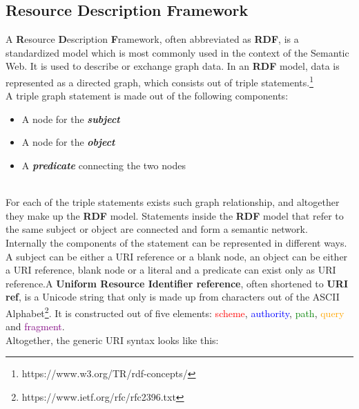 \documentclass[12pt, oneside]{article}
\begin{document}
\subsection{Resource Description Framework} \label{rdf}
A \textbf{R}esource \textbf{D}escription \textbf{F}ramework, often abbreviated as \textbf{RDF}, is a standardized model which is most commonly used in the context of the Semantic Web. It is used to describe or exchange graph data. In an \textbf{RDF} model, data is represented as a directed graph, which consists out of triple statements.\footnote[4]{https://www.w3.org/TR/rdf-concepts/}
\\
A triple graph statement is made out of the following components:
\vspace{0.3cm}\\
\begin{minipage}{.5\textwidth}
    \begin{itemize}
        \item A node for the \textit{\textbf{subject}}
        \item A node for the \textit{\textbf{object}}
        \item A \textit{\textbf{predicate}} connecting the two nodes
    \end{itemize} 
\end{minipage}
\begin{minipage}{.5\textwidth}
\end{minipage}
\vspace{0.3cm}\\
For each of the triple statements exists such graph relationship, and altogether they make up the \textbf{RDF} model. Statements inside the \textbf{RDF} model that refer to the same subject or object are connected and form a semantic network.
\vspace{0.3cm}\\
Internally the components of the statement can be represented in different ways. A subject can be either a URI reference or a blank node, an object can be either a URI reference, blank node or a literal and a predicate can exist only as URI reference.\footnotemark[4] A \textbf{Uniform Resource Identifier reference}, often shortened to \textbf{URI ref}, is a Unicode string that only is made up from characters out of the ASCII Alphabet\footnote[5]{https://www.ietf.org/rfc/rfc2396.txt}. It is constructed out of five elements: \textcolor{red}{scheme}, \textcolor{blue}{authority}, \textcolor{green}{path}, \textcolor{orange}{query} and \textcolor{purple}{fragment}.\\ Altogether, the generic URI syntax looks like this:
\end{document}
